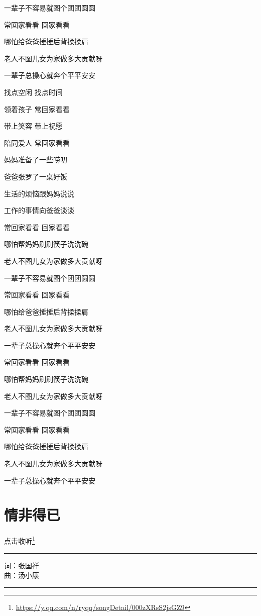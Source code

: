 \documentclass[]{ctexbook}
\renewcommand{\href}[2]{#2\footnote{\url{#1}}}
\begin{document}
一辈子不容易就图个团团圆圆

常回家看看 回家看看

哪怕给爸爸捶捶后背揉揉肩

老人不图儿女为家做多大贡献呀

一辈子总操心就奔个平平安安

找点空闲 找点时间

领着孩子 常回家看看

带上笑容 带上祝愿

陪同爱人 常回家看看

妈妈准备了一些唠叨

爸爸张罗了一桌好饭

生活的烦恼跟妈妈说说

工作的事情向爸爸谈谈

常回家看看 回家看看

哪怕帮妈妈刷刷筷子洗洗碗

老人不图儿女为家做多大贡献呀

一辈子不容易就图个团团圆圆

常回家看看 回家看看

哪怕给爸爸捶捶后背揉揉肩

老人不图儿女为家做多大贡献呀

一辈子总操心就奔个平平安安

常回家看看 回家看看

哪怕帮妈妈刷刷筷子洗洗碗

老人不图儿女为家做多大贡献呀

一辈子不容易就图个团团圆圆

常回家看看 回家看看

哪怕给爸爸捶捶后背揉揉肩

老人不图儿女为家做多大贡献呀

一辈子总操心就奔个平平安安

\section*{情非得已}\label{under-the-circumstances}


\href{https://y.qq.com/n/ryqq/songDetail/000zXRsS2jsGZ9}{点击收听}

\begin{center}\rule{0.5\linewidth}{0.5pt}\end{center}

词：张国祥\\
曲：汤小康

\begin{center}\rule{0.5\linewidth}{0.5pt}\end{center}
\end{document}
